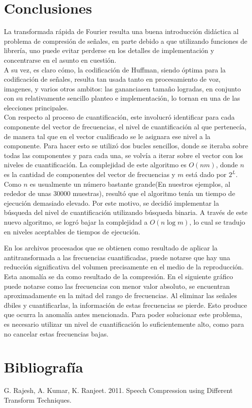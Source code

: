 \documentclass[a4paper,11pt]{article}
\begin{document}
\section{Conclusiones}
La transformada rápida de Fourier resulta una buena introducción didáctica al
problema de compresión de señales, en parte debido a que utilizando funciones
de librería, uno puede evitar perderse en los detalles de implementación y
concentrarse en el asunto en cuestión. \\
A su vez, es claro cómo, la codificación de Huffman, siendo óptima para la
codificación de señales, resulta tan usada tanto en procesamiento de voz,
imagenes, y varios otros ambitos: las gananciasen tamaño logradas, en conjunto
con su relativamente sencillo planteo e implementación, lo tornan en una de las
elecciones principales. \\

Con respecto al proceso de cuantificación, este involucró identificar para
cada componente del vector de frecuencias, el nivel de cuantificación al que
pertenecía, de manera tal que en el vector cualificado se le asignara ese nivel
a la componente. Para hacer esto se utilizó dos bucles sencillos, donde se
iteraba sobre todas las componentes y para cada una, se volvía a iterar sobre
el vector con los niveles de cuantificación. La complejidad de este algoritmo
es $O(nm)$, donde $n$ es la cantidad de componentes del vector de frecuencias y
$m$ está dado por $2^{L}$. Como $n$ es usualmente un número bastante grande(En
nuestros ejemplos, al rededor de unas 30000 muestras), resultó que el algoritmo
tenía un tiempo de ejecución demasiado elevado. Por este motivo, se decidió
implementar la búsqueda del nivel de cuantificación utilizando búsqueda
binaria. A través de este nuevo algoritmo, se logró bajar la complejidad a
$O(n\log m)$, lo cual se tradujo en niveles aceptables de tiempos de ejecución.

En los archivos procesados que se obtienen como resultado de aplicar la
antitransformada a las frecuencias cuantificadas, puede notarse que hay una
reducción significativa del volumen precisamente en el medio de la
reproducción. Esta anomalía se da como resultado de la compresión. En el
siguiente gráfico puede notarse como las frecuencias con menor valor absoluto,
se encuentran aproximadamente en la mitad del rango de frecuencias.
Al eliminar las señales dbiles y cuantificarlas, la información de estas
frecuencias se pierde. Esto produce que ocurra la anomalía antes mencionada.
Para poder solucionar este problema, es necesario utilizar un nivel de
cuantificación lo suficientemente alto, como para no cancelar estas frecuencias
bajas.
\newpage
\section{Bibliograf\'ia}
G. Rajesh, A. Kumar, K. Ranjeet. 2011. Speech Compression using Different Transform Techniques.
\end{document}
